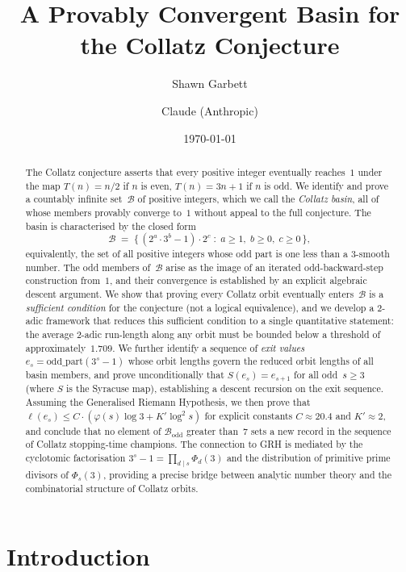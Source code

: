 \documentclass[12pt]{amsart}
\title{A Provably Convergent Basin for the Collatz Conjecture}
\author{Shawn Garbett}
\author{Claude (Anthropic)}
\date{\today}
\theoremstyle{definition}
\newcommand{\basin}{\mathcal{B}}
\begin{document}
\begin{abstract}
The Collatz conjecture asserts that every positive integer eventually reaches~$1$
under the map $T(n) = n/2$ if $n$ is even, $T(n) = 3n+1$ if $n$ is odd.
We identify and prove a countably infinite set~$\basin$ of positive integers,
which we call the \emph{Collatz basin}, all of whose members provably converge
to~$1$ without appeal to the full conjecture.
The basin is characterised by the closed form
\[
  \basin
  \;=\;
  \bigl\{\, (2^{a} \cdot 3^{b} - 1) \cdot 2^c \;:\;
            a \geq 1,\; b \geq 0,\; c \geq 0 \,\bigr\},
\]
equivalently, the set of all positive integers whose odd part is one less
than a 3-smooth number.
The odd members of~$\basin$ arise as the image of an iterated
odd-backward-step construction from~$1$, and their convergence is established
by an explicit algebraic descent argument.
We show that proving every Collatz orbit eventually enters~$\basin$ is
a \emph{sufficient condition} for the conjecture (not a logical equivalence),
and we develop a 2-adic framework that reduces this sufficient condition to a
single quantitative statement: the average 2-adic run-length along any orbit
must be bounded below a threshold of approximately~$1.709$.
We further identify a sequence of \emph{exit values} $e_s = \mathrm{odd\_part}(3^s-1)$
whose orbit lengths govern the reduced orbit lengths of all basin members,
and prove unconditionally that $S(e_s) = e_{s+1}$ for all odd~$s \geq 3$
(where $S$ is the Syracuse map), establishing a descent recursion on the
exit sequence.
Assuming the Generalised Riemann Hypothesis, we then prove that
$\ell(e_s) \leq C\cdot(\varphi(s)\log 3 + K'\log^2 s)$ for explicit constants
$C \approx 20.4$ and $K' \approx 2$, and conclude that no element of
$\basin_{\mathrm{odd}}$ greater than~$7$ sets a new record in the sequence of
Collatz stopping-time champions.
The connection to GRH is mediated by the cyclotomic factorisation
$3^s - 1 = \prod_{d \mid s} \Phi_d(3)$ and the distribution of primitive
prime divisors of $\Phi_s(3)$, providing a precise bridge between analytic
number theory and the combinatorial structure of Collatz orbits.
\end{abstract}

\maketitle

\tableofcontents

\section{Introduction}
\end{document}
